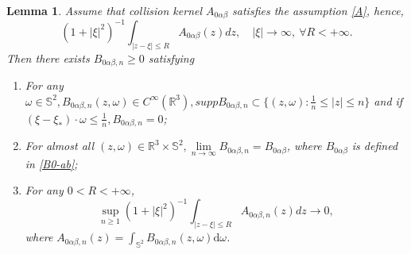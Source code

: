 \documentclass[reqno,11pt]{amsart}
\newtheorem{lemma}{Lemma}[section]
\numberwithin{equation}{section}
\def\d{\mathrm{d}}
\def\R{\mathbb{R}}
\begin{document}
	\begin{lemma}\label{Lemma 4.12}
	Assume that collision kernel $A_{0\alpha \beta }$ satisfies the assumption \eqref{A}, hence,
	\begin{equation*}
		(1+|\xi|^2)^{-1} \int_{|z-\xi |\leq R } A_{0\alpha \beta } (z)dz, \quad |\xi|\rightarrow \infty, \ \forall R <+\infty .
	\end{equation*}	
	Then there exists $B_{0\alpha \beta ,n }\geq 0 $ satisfying
	\begin{enumerate}
		\item {For any $\omega\in \mathbb{S}^2, B_{0\alpha \beta ,n } (z,\omega ) \in C^\infty (\R^3 ),supp B_{0\alpha \beta , n} \subset \{(z,\omega ): \frac{1}{n} \leq |z| \leq n \}$ and if $ (\xi -\xi_* ) \cdot \omega \leq \frac{1}{n} , B_{0\alpha \beta ,n } =0$;}\label{1 of Lemma 4.12}
		\item  {For almost all $(z,\omega )\in \R^3 \times \mathbb{S}^2 , \lim \limits_{n\rightarrow \infty } B_{0\alpha \beta ,n } =B_{0\alpha \beta }$, where $B_{0\alpha \beta }$ is defined in \eqref{B0-ab};} \label{2 of Lemma 4.12}
		\item {For any $0 < R < + \infty$,
			\begin{equation*}
				\sup \limits_{n \geq 1} (1+|\xi|^2 )^{-1} \int_{|z-\xi |\leq R } A_{0\alpha \beta ,n } (z) dz \rightarrow 0 ,
		\end{equation*}	
where $A_{0 \alpha \beta , n} (z) = \int_{ \mathbb{S}^2 } B_{0 \alpha \beta, n} (z, \omega) \d \omega$. }\label{3 of Lemma 4.12}
	\end{enumerate}
\end{lemma}	
\end{document}
